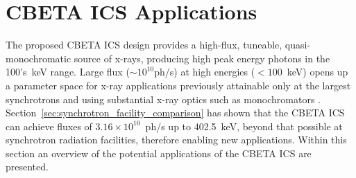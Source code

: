 \documentclass[../main.tex]{subfiles}
\begin{document}
\section{CBETA ICS Applications}
\label{sec:CBETA_ICS_applications}

The proposed CBETA ICS design provides a high-flux, tuneable, quasi-monochromatic source of x-rays, producing high peak energy photons in the 100's~\si{\kilo\electronvolt} range. Large flux ($\sim 10^{10}$ph/\si{\second}) at high energies ($< 100$~\si{\kilo\electronvolt}) opens up a parameter space for x-ray applications previously attainable only at the largest synchrotrons and using substantial x-ray optics such as monochromators \cite{caciuffo1987monochromators}. Section~\ref{sec:synchrotron_facility_comparison} has shown that the CBETA ICS can achieve fluxes of $3.16\times 10^{10}$~ph/\si{\second} up to 402.5~\si{\kilo\electronvolt}, beyond that possible at synchrotron radiation facilities, therefore enabling new applications. Within this section an overview of the potential applications of the CBETA ICS are presented.   
\end{document}
